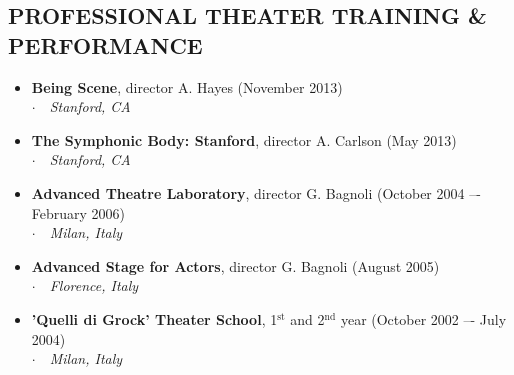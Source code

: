 \documentclass[line,margin]{res}
\newcommand{\superscript}[1]{\ensuremath{^{\textrm{#1}}}}
\newcommand{\placestyle}[1]{\footnotesize $\cdot$\ \ {\emph{#1}}}
\newcommand{\datestyle}[1]{{\tiny \dotfill} {\small (#1)}}
\begin{document}
\begin{resume}
\section{PROFESSIONAL THEATER TRAINING \& PERFORMANCE}
\begin{itemize}
\item {\bf Being Scene}, director A. Hayes \datestyle{November 2013} \\
  { \placestyle{Stanford, CA} }
\item {\bf The Symphonic Body: Stanford}, director A. Carlson \datestyle{May 2013} \\
  { \placestyle{Stanford, CA} }
\item {\bf Advanced Theatre Laboratory}, director G. Bagnoli \datestyle{October 2004 –- February 2006} \\
  { \placestyle{Milan, Italy} }
\item {\bf Advanced Stage for Actors}, director G. Bagnoli \datestyle{August 2005} \\
  { \placestyle{Florence, Italy} }
\item {\bf 'Quelli di Grock' Theater School}, 1\superscript{st} and 2\superscript{nd} year \datestyle{October 2002 –- July 2004} \\
  { \placestyle{Milan, Italy} }
\end{itemize}

\newpage

\end{resume}
\end{document}
